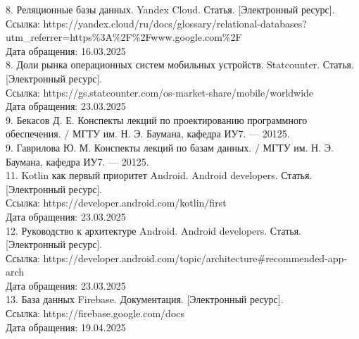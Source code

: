 \hspace{-1.25cm}
8. Реляционные базы данных. Yandex Cloud. Статья. [Электронный ресурс]. \\
Ссылка: https://yandex.cloud/ru/docs/glossary/relational-databases?utm\_referrer=https\%3A\%2F\%2Fwww.google.com\%2F \\
Дата обращения: 16.03.2025 \\

\hspace{-1.25cm}
8. Доли рынка операционных систем мобильных устройств. Statcounter. Статья. [Электронный ресурс]. \\
Ссылка: https://gs.statcounter.com/os-market-share/mobile/worldwide \\
Дата обращения: 23.03.2025 \\

\hspace{-1.25cm}
9. Бекасов Д. Е. Конспекты лекций по проектированию программного обеспечения. / МГТУ им. Н. Э. Баумана, кафедра ИУ7. --- 20125. \\

\hspace{-1.25cm}
9. Гаврилова Ю. М. Конспекты лекций по базам данных. / МГТУ им. Н. Э. Баумана, кафедра ИУ7. --- 20125. \\

\hspace{-1.25cm}
11. Kotlin как первый приоритет Android. Android developers. Статья. [Электронный ресурс]. \\
Ссылка: https://developer.android.com/kotlin/first \\
Дата обращения: 23.03.2025 \\

\hspace{-1.25cm}
12. Руководство к архитектуре Android. Android developers. Статья. [Электронный ресурс]. \\
Ссылка: https://developer.android.com/topic/architecture#recommended-app-arch \\
Дата обращения: 23.03.2025 \\

\hspace{-1.25cm}
13. База данных Firebase. Документация. [Электронный ресурс]. \\
Ссылка: https://firebase.google.com/docs \\
Дата обращения: 19.04.2025 \\